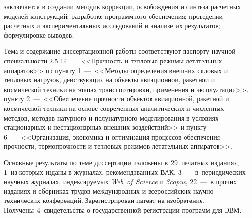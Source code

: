 {\contribution} заключается в создании методик коррекции, освобождения и синтеза расчетных моделей конструкций; разработке программного обеспечения; проведении расчетных и экспериментальных исследований и анализе их результатов; формулировке выводов.

{\pasport}

Тема и содержание диссертационной работы соответствуют паспорту научной специальности 2.5.14~---~<<Прочность и тепловые режимы летательных аппаратов>> по пункту 1~---~<<Методы определения внешних силовых и тепловых нагрузок, действующих на объекты авиационной, ракетной и космической техники на этапах транспортировки, применения и эксплуатации>>, пункту 2~---~<<Обеспечение прочности объектов авиационной, ракетной и космической техники на основе современных аналитических и численных методов, методов натурного и полунатурного моделирования в условиях стационарных и нестационарных внешних воздействий>> и пункту 6~---~<<Организация, экономика и оптимизация процессов обеспечения прочности, термопрочности и тепловых режимов летательных аппаратов>>.

{\publications} 

Основные результаты по теме диссертации изложены в~29~печатных изданиях, 1~из которых изданы в журналах, рекомендованных ВАК, 3~---~в~периодических научных журналах, индексируемых \textit{Web~of~Science} и \textit{Scopus}, 22~---~в прочих изданиях и сборниках трудов международных и всероссийских научно-технических конференций. Зарегистрирован патент на изобретение. Получены~4~свидетельства о государственной регистрации программ для ЭВМ.
